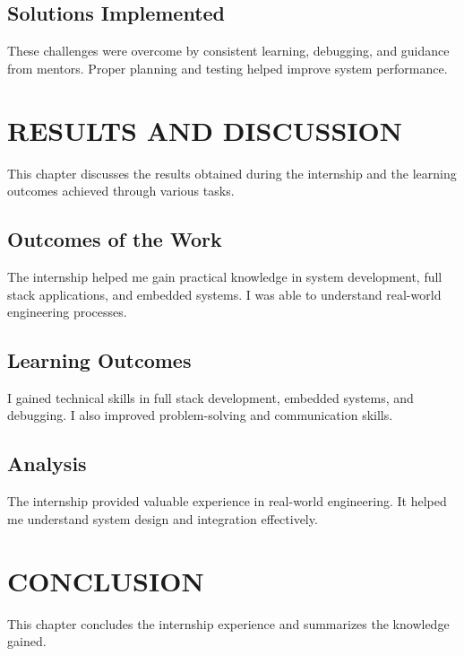 \documentclass[12pt,a4paper]{report}
\begin{document}
\section{Solutions Implemented}
These challenges were overcome by consistent learning, debugging, and guidance from mentors. Proper planning and testing helped improve system performance.



\chapter{RESULTS AND DISCUSSION}

This chapter discusses the results obtained during the internship and the learning outcomes achieved through various tasks.



\section{Outcomes of the Work}
The internship helped me gain practical knowledge in system development, full stack applications, and embedded systems. I was able to understand real-world engineering processes.

\section{Learning Outcomes}
I gained technical skills in full stack development, embedded systems, and debugging. I also improved problem-solving and communication skills.

\section{Analysis}
The internship provided valuable experience in real-world engineering. It helped me understand system design and integration effectively.



\chapter{CONCLUSION}

This chapter concludes the internship experience and summarizes the knowledge gained.
\end{document}
